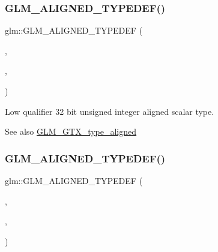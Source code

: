 \subsubsection{\texorpdfstring{G\+L\+M\+\_\+\+A\+L\+I\+G\+N\+E\+D\+\_\+\+T\+Y\+P\+E\+D\+E\+F()}{GLM\_ALIGNED\_TYPEDEF()}\hspace{0.1cm}{\footnotesize\ttfamily [79/209]}}
{\footnotesize\ttfamily glm\+::\+G\+L\+M\+\_\+\+A\+L\+I\+G\+N\+E\+D\+\_\+\+T\+Y\+P\+E\+D\+EF (\begin{DoxyParamCaption}\item[{\hyperlink{group__gtc__type__precision_gaba06fae1dd98ca50c017e68345df0365}{lowp\+\_\+u32}}]{,  }\item[{aligned\+\_\+lowp\+\_\+u32}]{,  }\item[{4}]{ }\end{DoxyParamCaption})}

Low qualifier 32 bit unsigned integer aligned scalar type. \begin{DoxySeeAlso}{See also}
\hyperlink{group__gtx__type__aligned}{G\+L\+M\+\_\+\+G\+T\+X\+\_\+type\+\_\+aligned} 
\end{DoxySeeAlso}
\mbox{\label{group__gtx__type__aligned_gacca5f13627f57b3505676e40a6e43e5e}} 
\subsubsection{\texorpdfstring{G\+L\+M\+\_\+\+A\+L\+I\+G\+N\+E\+D\+\_\+\+T\+Y\+P\+E\+D\+E\+F()}{GLM\_ALIGNED\_TYPEDEF()}\hspace{0.1cm}{\footnotesize\ttfamily [80/209]}}
{\footnotesize\ttfamily glm\+::\+G\+L\+M\+\_\+\+A\+L\+I\+G\+N\+E\+D\+\_\+\+T\+Y\+P\+E\+D\+EF (\begin{DoxyParamCaption}\item[{\hyperlink{group__gtc__type__precision_ga61ed4c68a4cffb77cd63cc107119123a}{lowp\+\_\+u64}}]{,  }\item[{aligned\+\_\+lowp\+\_\+u64}]{,  }\item[{8}]{ }\end{DoxyParamCaption})}

